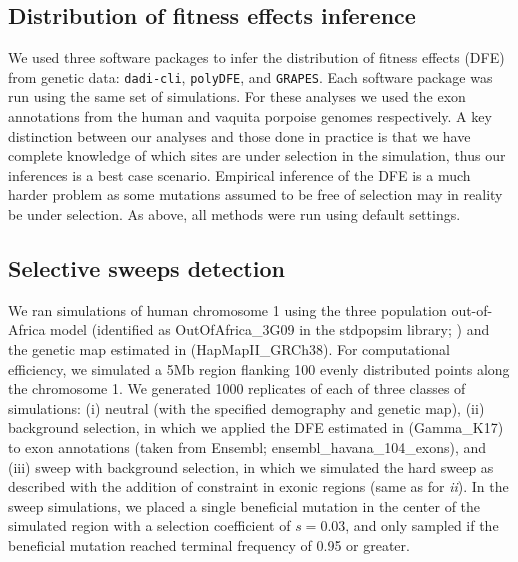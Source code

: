 \documentclass[hidelinks]{article}
\newcommand{\polydfe}{\texttt{polyDFE}\xspace}
\newcommand{\dadicli}{\texttt{dadi-cli}\xspace}
\newcommand{\grapes}{\texttt{GRAPES}\xspace}
\begin{document}
    \subsection*{Distribution of fitness effects inference}
    We used three software packages to infer the distribution of fitness effects (DFE) from genetic data:
    \dadicli \citep{Huang2023,kim2017inference}, \polydfe \citep{tataru2020polydfe}, and \grapes \citep{galtier2016adaptive}.
    Each software package was run using the same set of simulations.
    For these analyses we used the exon annotations from the human and vaquita porpoise genomes respectively.
    A key distinction between our analyses and those done in practice
    is that we have complete knowledge of which sites are under selection in the simulation,
    thus our inferences is a best case scenario. Empirical inference of the DFE is a much
    harder problem as some mutations assumed to be free of selection
    may in reality be under selection. As above, all methods were run using default settings.

    \subsection*{Selective sweeps detection}
    We ran simulations of human chromosome 1 using the three population out-of-Africa model
    (identified as OutOfAfrica\_3G09 in the stdpopsim library; \cite{gutenkunst2009inferring})
    and the genetic map estimated in \citet{international2007second} (HapMapII\_GRCh38).
    For computational efficiency, we simulated a 5Mb region flanking 100 evenly distributed points along the chromosome 1.
    We generated 1000 replicates of each of three classes of simulations:
    (i) neutral (with the specified demography and genetic map),
    (ii) background selection, in which we applied the DFE estimated in \citet{kim2017inference} (Gamma\_K17) to exon annotations (taken from Ensembl; ensembl\_havana\_104\_exons),
    and (iii) sweep with background selection, in which we simulated the hard sweep as described with the addition of constraint in exonic regions (same as for \emph{ii}).
    In the sweep simulations, we placed a single beneficial mutation in the center of the simulated region with a selection coefficient of $s = 0.03$, and only sampled if the beneficial mutation reached terminal frequency of 0.95 or greater.
\end{document}
